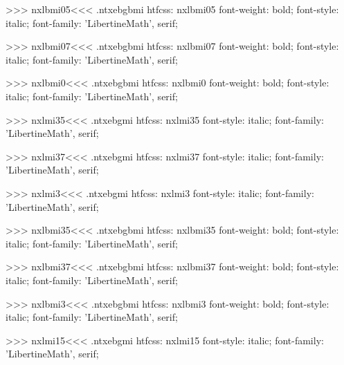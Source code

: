 >>>
\<nxlbmi05\><<<
.ntxebgbmi
htfcss:  nxlbmi05  font-weight: bold; font-style: italic; font-family: 'LibertineMath', serif;

>>>
\<nxlbmi07\><<<
.ntxebgbmi
htfcss:  nxlbmi07  font-weight: bold; font-style: italic; font-family: 'LibertineMath', serif;

>>>
\<nxlbmi0\><<<
.ntxebgbmi
htfcss:  nxlbmi0  font-weight: bold; font-style: italic; font-family: 'LibertineMath', serif;

>>>
\<nxlmi35\><<<
.ntxebgmi
htfcss:  nxlmi35  font-style: italic; font-family: 'LibertineMath', serif;

>>>
\<nxlmi37\><<<
.ntxebgmi
htfcss:  nxlmi37  font-style: italic; font-family: 'LibertineMath', serif;

>>>
\<nxlmi3\><<<
.ntxebgmi
htfcss:  nxlmi3  font-style: italic; font-family: 'LibertineMath', serif;

>>>
\<nxlbmi35\><<<
.ntxebgbmi
htfcss:  nxlbmi35  font-weight: bold; font-style: italic; font-family: 'LibertineMath', serif;

>>>
\<nxlbmi37\><<<
.ntxebgbmi
htfcss:  nxlbmi37  font-weight: bold; font-style: italic; font-family: 'LibertineMath', serif;

>>>
\<nxlbmi3\><<<
.ntxebgbmi
htfcss:  nxlbmi3  font-weight: bold; font-style: italic; font-family: 'LibertineMath', serif;

>>>
\<nxlmi15\><<<
.ntxebgmi
htfcss:  nxlmi15  font-style: italic; font-family: 'LibertineMath', serif;

